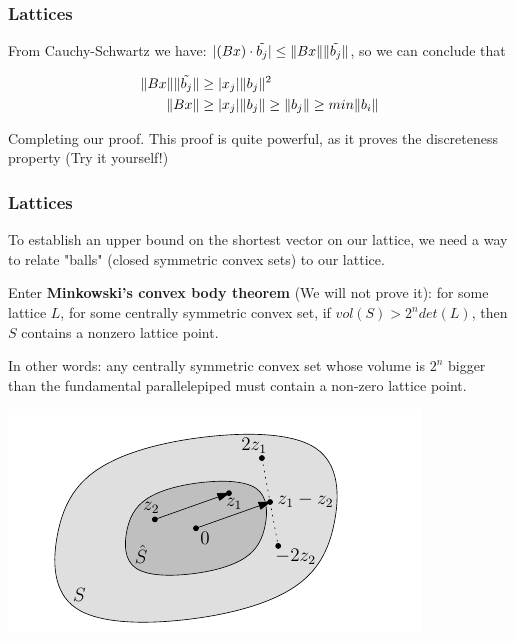 \documentclass{beamer}
\DeclarePairedDelimiter{\norm}{\lVert}{\rVert}
\begin{document}
\begin{frame}
\frametitle{Lattices}
From Cauchy-Schwartz we have: $|(Bx) \cdot \tilde{b_j}| \leq \norm{Bx} \norm{ \tilde{b_j}}$, so we can conclude that

\begin{align*}
\norm{Bx} \norm{ \tilde{b_j}} &\geq |x_j|\norm{b_j}^2 \\
\norm{Bx}  &\geq |x_j|\norm{b_j} \geq \norm{b_j} \geq min \norm{b_i}
\end{align*}

Completing our proof. This proof is quite powerful, as it proves the discreteness property (Try it yourself!)

\end{frame}

\begin{frame}
\frametitle{Lattices}

To establish an upper bound on the shortest vector on our lattice, we need a way to relate "balls" (closed symmetric convex sets) to our lattice.

Enter \textbf{Minkowski's convex body theorem} (We will not prove it): for some lattice $L$, for some centrally symmetric convex set, if $vol(S) > 2^n det(L)$, then $S$ contains a nonzero lattice point. 

In other words: any centrally symmetric convex set whose volume is $2^n$ bigger than the fundamental parallelepiped  must contain a non-zero lattice point.

\begin{center}
\includegraphics[scale=0.3]{minkowski-convex-body.png}
\end{center}
\end{frame}
\end{document}
